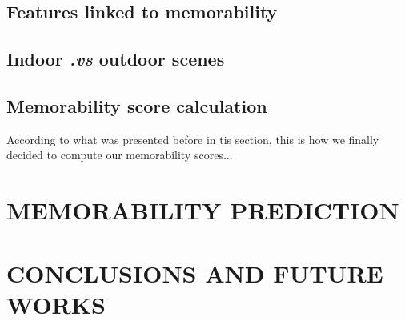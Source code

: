 \documentclass[sigconf]{acmart}
\begin{document}
\subsection{Features linked to memorability}

\subsection{Indoor \textit{.vs} outdoor scenes}




\subsection{Memorability score calculation}
According to what was presented before in tis section, this is how we finally decided to compute our memorability scores...



\section{MEMORABILITY PREDICTION} %











\section{CONCLUSIONS AND FUTURE WORKS}
\end{document}
